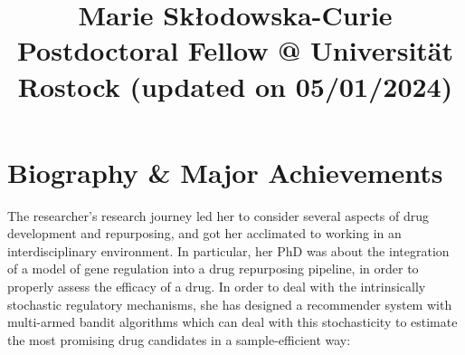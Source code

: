 \documentclass[11pt,a4paper,sans]{moderncv}
\title{Marie Skłodowska-Curie Postdoctoral Fellow @ Universität Rostock {\tiny (updated on 05/01/2024)}}
\begin{document}
\makecvtitle

\vspace{-1.5cm}
\section{Biography \& Major Achievements}

The researcher’s research journey led her to consider several aspects of drug development and repurposing, and got her acclimated to working in an interdisciplinary environment. In particular, her PhD was about the integration of a model of gene regulation into a drug repurposing pipeline, in order to properly assess the efficacy of a drug. In order to deal with the intrinsically stochastic regulatory mechanisms, she has designed a recommender system with multi-armed bandit algorithms which can deal with this stochasticity to estimate the most promising drug candidates in a sample-efficient way:
\end{document}
